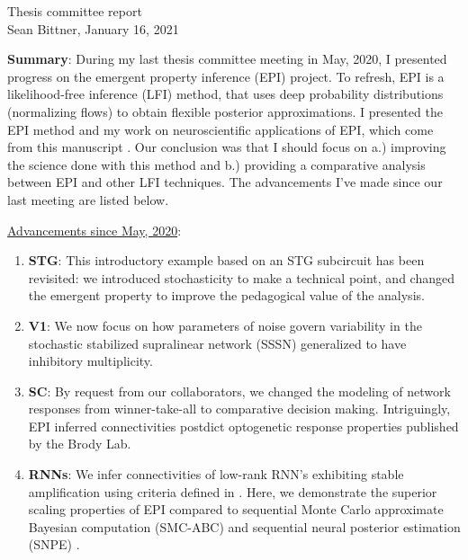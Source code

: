 \documentclass[11pt]{article}
\begin{document}
\medskip                        %

\thispagestyle{plain}
\begin{center}                  %
{\Large Thesis committee report} \\
Sean Bittner, January 16, 2021
\end{center}

\textbf{Summary}:
During my last thesis committee meeting in May, 2020, I presented progress on the emergent property inference (EPI) project.  
To refresh, EPI is a likelihood-free inference (LFI) method, that uses deep probability distributions (normalizing flows) to obtain flexible posterior approximations.  
I presented the EPI method and my work on neuroscientific applications of EPI, which come from this manuscript \cite{bittner2019interrogating}.
Our conclusion was that I should focus on a.) improving the science done with this method and b.) providing a comparative analysis between EPI and other LFI techniques.
The advancements I've made since our last meeting are listed below.

\underline{Advancements since May, 2020}:
\begin{enumerate}
\item \textbf{STG}: This introductory example based on an STG subcircuit \cite{gutierrez2013multiple} has been revisited: we introduced stochasticity to make a technical point, and changed the emergent property to improve the pedagogical value of the analysis.
\item \textbf{V1}: We now focus on how parameters of noise govern variability in the stochastic stabilized supralinear network (SSSN) \cite{hennequin2018dynamical} generalized to have inhibitory multiplicity.
\item \textbf{SC}: By request from our collaborators, we changed the modeling of network responses from winner-take-all to comparative decision making.
Intriguingly, EPI inferred connectivities postdict optogenetic response properties published by the Brody Lab.
\item \textbf{RNNs}: We infer connectivities of low-rank RNN's exhibiting stable amplification using criteria defined in \cite{bondanelli2020coding}.  
Here, we demonstrate the superior scaling properties of EPI compared to sequential Monte Carlo approximate Bayesian computation (SMC-ABC) \cite{sisson2007sequential} and sequential neural posterior estimation (SNPE) \cite{gonccalves2020training}.
\end{enumerate}
\end{document}
